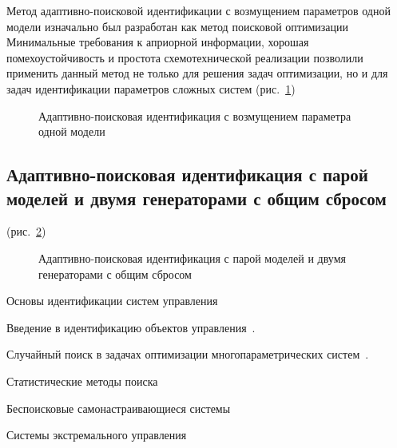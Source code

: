 Метод адаптивно-поисковой идентификации с возмущением параметров одной модели
изначально был разработан как метод поисковой оптимизации
\cite{mich_92}
Минимальные требования к априорной информации, хорошая помехоустойчивость и
простота схемотехнической реализации позволили применить данный метод не только
для решения задач оптимизации, но и для задач идентификации параметров сложных
систем
(рис.~\ref{atu:f:apid1})

\begin{figure}[htb!]
\begin{center}

\end{center}
\caption{Адаптивно-поисковая идентификация с возмущением параметра одной модели}
\label{atu:f:apid1}
\end{figure}



\subsection{Адаптивно-поисковая идентификация с парой моделей и двумя генераторами с общим сбросом} %

(рис.~\ref{atu:f:apid2})

\begin{figure}[htb!]
\begin{center}

\end{center}
\caption{Адаптивно-поисковая идентификация с парой моделей и двумя генераторами с общим сбросом}
\label{atu:f:apid2}
\end{figure}

Основы идентификации систем управления~\cite{eykhoff_id_base,eykhoff_modern_id,gropp_methods_id,deith_method_id_ds,lung_id_sys,seidg_id_su,leondes_modern_tu,nelles_nlsys_id}

Введение в идентификацию объектов управления~\cite{rastr_intro,rastr_adop_complex_sys}.

Случайный поиск в задачах оптимизации многопараметрических систем~\cite{rastr_rand_search,rastr_rand_search_adopt}.

Статистические методы поиска~\cite{rastr_stat_meth_search}

Беспоисковые самонастраивающиеся системы~\cite{kozlov_nosearch_sns}

Системы экстремального управления~\cite{rastr_seu,kras_dyn_nsn}

